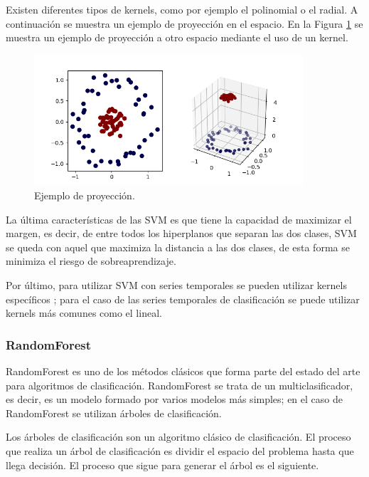 Existen diferentes tipos de kernels, como por ejemplo el polinomial o el radial. A continuación se muestra un ejemplo de proyección en el espacio. En la Figura \ref{fig:215} se muestra un ejemplo de proyección a otro espacio mediante el uso de un kernel.\newline

\begin{figure}[H]
	\centering
	\includegraphics[width=100mm]{imagenes/svm_kernel_example.png}
	\caption{Ejemplo de proyección.}
	\label{fig:215}
\end{figure}
\verticalspace

La última características de las SVM es que tiene la capacidad
de maximizar el margen, es decir, de entre todos los hiperplanos que separan las dos clases, SVM se queda con aquel que maximiza la distancia a las dos clases, de esta forma se minimiza el riesgo de sobreaprendizaje.\newline

Por último, para utilizar SVM con series temporales se pueden utilizar kernels específicos \cite{shimodaira2002dynamic}; para el caso de las series temporales de clasificación se puede utilizar kernels más comunes como el lineal.\newline

\subsubsection{RandomForest}
RandomForest \cite{breiman2001random} es uno de los métodos clásicos que forma parte del estado del arte para algoritmos de clasificación. RandomForest se trata de un multiclasificador, es decir, es un modelo formado por varios modelos más simples; en el caso de RandomForest se utilizan árboles de clasificación.\newline

Los árboles de clasificación son un algoritmo clásico de clasificación. El proceso que realiza un árbol de clasificación es dividir el espacio del problema hasta que llega decisión. El proceso que sigue para generar el árbol es el siguiente.\newline

